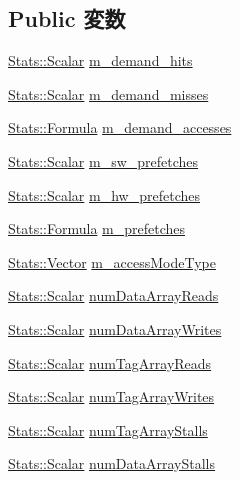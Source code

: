 \subsection*{Public 変数}
\begin{DoxyCompactItemize}
\item 
\hyperlink{classStats_1_1Scalar}{Stats::Scalar} \hyperlink{classCacheMemory_a47c68eff474df127a7e5e36b40965bdc}{m\_\-demand\_\-hits}
\item 
\hyperlink{classStats_1_1Scalar}{Stats::Scalar} \hyperlink{classCacheMemory_a3f24c5bd8e3da8dbb584cf70d3de4f09}{m\_\-demand\_\-misses}
\item 
\hyperlink{classStats_1_1Formula}{Stats::Formula} \hyperlink{classCacheMemory_a6d06da3f5d70180680054f20a4862051}{m\_\-demand\_\-accesses}
\item 
\hyperlink{classStats_1_1Scalar}{Stats::Scalar} \hyperlink{classCacheMemory_af2b41944a982febf9af12d438f137b87}{m\_\-sw\_\-prefetches}
\item 
\hyperlink{classStats_1_1Scalar}{Stats::Scalar} \hyperlink{classCacheMemory_a5ae5fe863837358e6e9a60e0b702fb94}{m\_\-hw\_\-prefetches}
\item 
\hyperlink{classStats_1_1Formula}{Stats::Formula} \hyperlink{classCacheMemory_a549248150d50bed3e4d815869edee7de}{m\_\-prefetches}
\item 
\hyperlink{classStats_1_1Vector}{Stats::Vector} \hyperlink{classCacheMemory_a83d90a771e3ee60100ef1730f1a118b1}{m\_\-accessModeType}
\item 
\hyperlink{classStats_1_1Scalar}{Stats::Scalar} \hyperlink{classCacheMemory_a0f63a1bbaf1dee7c23ab3ac06a80d775}{numDataArrayReads}
\item 
\hyperlink{classStats_1_1Scalar}{Stats::Scalar} \hyperlink{classCacheMemory_a97557f8d2f957731bdea9fd4537a140e}{numDataArrayWrites}
\item 
\hyperlink{classStats_1_1Scalar}{Stats::Scalar} \hyperlink{classCacheMemory_a3e723404e0119a13e13ca25460179249}{numTagArrayReads}
\item 
\hyperlink{classStats_1_1Scalar}{Stats::Scalar} \hyperlink{classCacheMemory_a3e43debd337a55436570324681b20000}{numTagArrayWrites}
\item 
\hyperlink{classStats_1_1Scalar}{Stats::Scalar} \hyperlink{classCacheMemory_aa8cfd5b3d3480062677e2229d8573483}{numTagArrayStalls}
\item 
\hyperlink{classStats_1_1Scalar}{Stats::Scalar} \hyperlink{classCacheMemory_a4034a29f6d2be3493f40aaa13ca6c77a}{numDataArrayStalls}
\end{DoxyCompactItemize}
